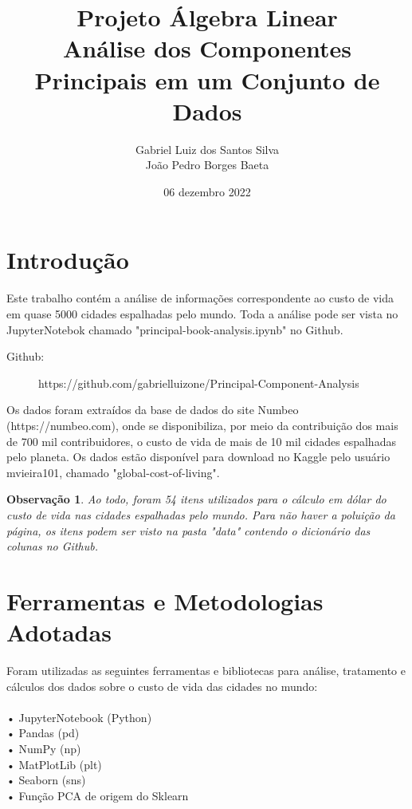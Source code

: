 \documentclass[11pt,a4paper]{article}
\title {Projeto Álgebra Linear \\[1ex] \large Análise dos Componentes Principais em um Conjunto de Dados}
\author{Gabriel Luiz dos Santos Silva\\
João Pedro Borges Baeta
}
\date{06 dezembro 2022}
\newtheorem{3}{Observação}
\begin{document}
\maketitle



\section{Introdução} \hspace{0.6cm}
Este trabalho contém a análise de informações correspondente ao custo de vida em quase 5000 cidades espalhadas pelo mundo. Toda a análise pode ser vista no JupyterNotebok chamado "principal-book-analysis.ipynb" no Github.

\begin{description}
\item[Github:] https://github.com/gabrielluizone/Principal-Component-Analysis
\end{description}

Os dados foram extraídos da base de dados do site Numbeo (https://numbeo.com), onde se disponibiliza, por meio da contribuição dos mais de 700 mil contribuidores, o custo de vida de mais de 10 mil cidades espalhadas pelo planeta.  Os dados estão disponível para download no Kaggle pelo usuário mvieira101, chamado "global-cost-of-living".

\begin{3} \normalfont
Ao todo, foram 54 itens utilizados para o cálculo em dólar do custo de vida nas cidades espalhadas pelo mundo. Para não haver a poluição da página, os itens podem ser visto na pasta "data" contendo o dicionário das colunas no Github.
\end{3}

\section{Ferramentas e Metodologias Adotadas}
\hspace{0.6cm}Foram utilizadas as seguintes ferramentas e bibliotecas para análise, tratamento e cálculos dos dados sobre o custo de vida das cidades no mundo:\\\\
• JupyterNotebook (Python)\\
• Pandas (pd)\\
• NumPy (np)\\
• MatPlotLib (plt)\\
• Seaborn (sns)\\
• Função PCA de origem do Sklearn\\
\end{document}
